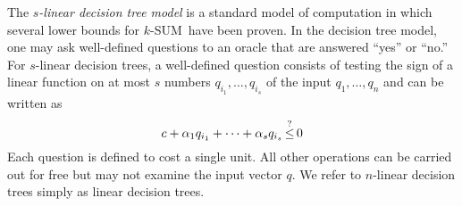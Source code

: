The \emph{\(s\)-linear decision tree model} is a standard model of computation
in which several lower bounds for \(k\)-SUM\ have been proven. In the decision tree
model, one may ask well-defined questions to an oracle that are answered
``yes'' or ``no.'' For $s$-linear decision trees, a well-defined question consists
of testing the sign of a linear function on at most \(s\) numbers \(q_{i_1},\ldots,q_{i_s}\) of the
input \(q_1,\ldots,q_n\) and can be written as
$$
	c + \alpha_1 q_{i_1} + \cdots + \alpha_s q_{i_s} \mathop{\le}^{?} 0
$$
Each question is defined to cost a single unit. All other operations can be
carried out for free but may not examine the input vector $q$. We refer to
$n$-linear decision trees simply as linear decision trees.
